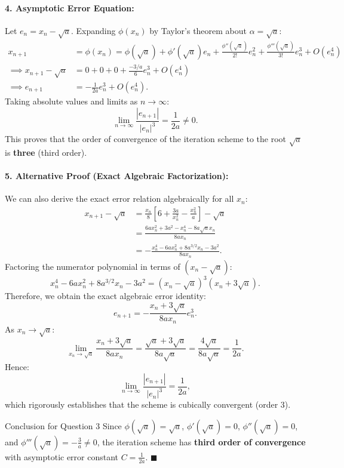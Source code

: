 \documentclass[11pt,a4paper]{article}
\begin{document}
\paragraph{4. Asymptotic Error Equation:}
Let $e_n = x_n - \sqrt{a}$. Expanding $\phi(x_n)$ by Taylor's theorem about $\alpha = \sqrt{a}$:
\begin{align*}
x_{n+1} &= \phi(x_n) = \phi(\sqrt{a}) + \phi'(\sqrt{a})e_n + \frac{\phi''(\sqrt{a})}{2!}e_n^2 + \frac{\phi'''(\sqrt{a})}{3!}e_n^3 + O(e_n^4) \\
\implies x_{n+1} - \sqrt{a} &= 0 + 0 + 0 + \frac{-3/a}{6} e_n^3 + O(e_n^4) \\
\implies e_{n+1} &= -\frac{1}{2a}e_n^3 + O(e_n^4).
\end{align*}
Taking absolute values and limits as $n \to \infty$:
\[
\lim_{n \to \infty} \frac{|e_{n+1}|}{|e_n|^3} = \frac{1}{2a} \neq 0.
\]
This proves that the order of convergence of the iteration scheme to the root $\sqrt{a}$ is \textbf{three} (third order).

\paragraph{5. Alternative Proof (Exact Algebraic Factorization):}
We can also derive the exact error relation algebraically for all $x_n$:
\begin{align*}
x_{n+1} - \sqrt{a} &= \frac{x_n}{8}\left[6 + \frac{3a}{x_n^2} - \frac{x_n^2}{a}\right] - \sqrt{a} \\
&= \frac{6a x_n^2 + 3a^2 - x_n^4 - 8a\sqrt{a}x_n}{8a x_n} \\
&= -\frac{x_n^4 - 6a x_n^2 + 8a^{3/2}x_n - 3a^2}{8a x_n}.
\end{align*}
Factoring the numerator polynomial in terms of $(x_n - \sqrt{a})$:
\[
x_n^4 - 6a x_n^2 + 8a^{3/2}x_n - 3a^2 = (x_n - \sqrt{a})^3 (x_n + 3\sqrt{a}).
\]
Therefore, we obtain the exact algebraic error identity:
\[
e_{n+1} = -\frac{x_n + 3\sqrt{a}}{8a x_n} e_n^3.
\]
As $x_n \to \sqrt{a}$:
\[
\lim_{x_n \to \sqrt{a}} \frac{x_n + 3\sqrt{a}}{8a x_n} = \frac{\sqrt{a} + 3\sqrt{a}}{8a\sqrt{a}} = \frac{4\sqrt{a}}{8a\sqrt{a}} = \frac{1}{2a}.
\]
Hence:
\[
\lim_{n \to \infty} \frac{|e_{n+1}|}{|e_n|^3} = \frac{1}{2a},
\]
which rigorously establishes that the scheme is cubically convergent (order 3).

\begin{answerbox}{Conclusion for Question 3}
Since $\phi(\sqrt{a}) = \sqrt{a}$, $\phi'(\sqrt{a}) = 0$, $\phi''(\sqrt{a}) = 0$, and $\phi'''(\sqrt{a}) = -\frac{3}{a} \neq 0$, the iteration scheme has \textbf{third order of convergence} with asymptotic error constant $C = \frac{1}{2a}$. \hfill $\blacksquare$
\end{answerbox}
\end{document}
